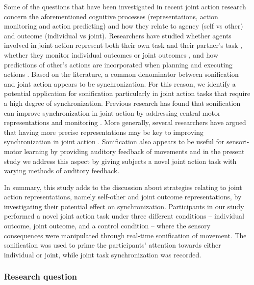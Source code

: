 \documentclass[10pt,a4paper,onecolumn]{article}
\begin{document}
Some of the questions that have been investigated in recent joint action research concern the aforementioned cognitive processes (representations, action monitoring and action predicting) and how they relate to agency (self vs other) and outcome (individual vs joint). Researchers have studied whether agents involved in joint action represent both their own task and their partner's task \autocite{loehrSoundYouMe2016}, whether they monitor individual outcomes or joint outcomes \autocite{loehrMonitoringIndividualJoint2013}, and how predictions of other's actions are incorporated when planning and executing actions \autocite{knoblichActionCoordinationGroups2003,kourtisPredictiveRepresentationOther2012,loehrTemporalCoordinationPerforming2011,vesperAreYouReady2013}. Based on the literature, a common denominator between sonification and joint action appears to be synchronization. For this reason, we identify a potential application for sonification particularly in joint action tasks that require a high degree of synchronization. Previous research has found that sonification can improve synchronization in joint action by addressing central motor representations \autocite{schmitzPerceptualEffectsAuditory2012} and monitoring \autocite{vesperMinimalArchitectureJoint2010}. More generally, several researchers have argued that having more precise representations may be key to improving synchronization in joint action \autocite{boltSensoryAttenuationAuditory2021,kellerPianistsDuetBetter2007,kourtisPredictiveRepresentationOther2012,sebanzJointActionBodies2006,wenkeWhatSharedJoint2011}. Sonification also appears to be useful for sensori-motor learning by providing auditory feedback of movements \autocite{bevilacquaSensoriMotorLearningMovement2016} and in the present study we address this aspect by giving subjects a novel joint action task with varying methods of auditory feedback.

In summary, this study adds to the discussion about strategies relating to joint action representations, namely self-other and joint outcome representations, by investigating their potential effect on synchronization. Participants in our study performed a novel joint action task under three different conditions -- individual outcome, joint outcome, and a control condition -- where the sensory consequences were manipulated through real-time sonification of movement. The sonification was used to prime the participants' attention towards either individual or joint, while joint task synchronization was recorded.

\hypertarget{research-question}{%
\subsubsection{Research question}\label{research-question}}
\end{document}

